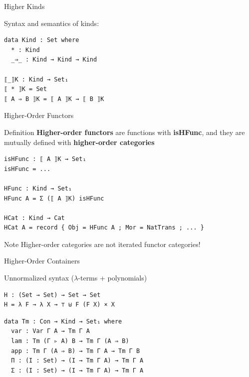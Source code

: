 \documentclass{beamer}
\begin{document}
\begin{frame}[fragile]{Higher Kinds}

Syntax and semantics of kinds:

\begin{exampleblock}{}
\begin{verbatim}
data Kind : Set where
  * : Kind
  _⇒_ : Kind → Kind → Kind

⟦_⟧K : Kind → Set₁
⟦ * ⟧K = Set
⟦ A ⇒ B ⟧K = ⟦ A ⟧K → ⟦ B ⟧K
\end{verbatim}
\end{exampleblock}

\end{frame}

\begin{frame}[fragile]{Higher-Order Functors}

\begin{block}{Definition}
\textbf{Higher-order functors} are functions with \textbf{isHFunc}, and they are mutually defined with \textbf{higher-order categories}
\end{block}

\begin{exampleblock}{}
\begin{verbatim}
isHFunc : ⟦ A ⟧K → Set₁
isHFunc = ...

HFunc : Kind → Set₁
HFunc A = Σ (⟦ A ⟧K) isHFunc

HCat : Kind → Cat
HCat A = record { Obj = HFunc A ; Mor = NatTrans ; ... }
\end{verbatim}
\end{exampleblock}

\pause
\begin{alertblock}{Note}
Higher-order categories are not iterated functor categories!
\end{alertblock}

\end{frame}

\begin{frame}[fragile]{Higher-Order Containers}

Unnormalized syntax ($\lambda$-terms + polynomials)

\begin{exampleblock}{}
\begin{verbatim}
H : (Set → Set) → Set → Set
H = λ F → λ X → ⊤ ⊎ F (F X) × X
\end{verbatim}
\end{exampleblock}

\begin{exampleblock}{}
\begin{verbatim}
data Tm : Con → Kind → Set₁ where
  var : Var Γ A → Tm Γ A
  lam : Tm (Γ ▹ A) B → Tm Γ (A ⇒ B)
  app : Tm Γ (A ⇒ B) → Tm Γ A → Tm Γ B
  Π : (I : Set) → (I → Tm Γ A) → Tm Γ A
  Σ : (I : Set) → (I → Tm Γ A) → Tm Γ A
\end{verbatim}
\end{exampleblock}
\end{frame}
\end{document}
